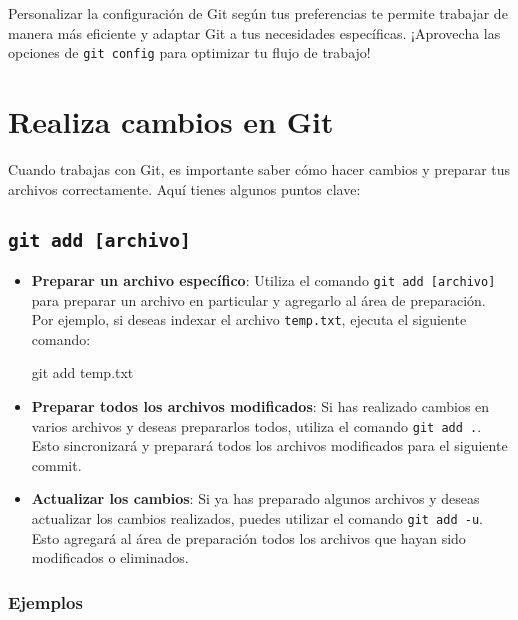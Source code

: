 \documentclass[
  a4paper,
]{article}
\newenvironment{Shaded}{}{}
\newcommand{\FunctionTok}[1]{\textcolor[rgb]{0.44,0.26,0.76}{#1}}
\newcommand{\NormalTok}[1]{\textcolor[rgb]{0.14,0.16,0.18}{#1}}
\begin{document}
Personalizar la configuración de Git según tus preferencias te permite
trabajar de manera más eficiente y adaptar Git a tus necesidades
específicas. ¡Aprovecha las opciones de \texttt{git\ config} para
optimizar tu flujo de trabajo!

\section{Realiza cambios en Git}\label{realiza-cambios-en-git}

Cuando trabajas con Git, es importante saber cómo hacer cambios y
preparar tus archivos correctamente. Aquí tienes algunos puntos clave:

\subsection{\texorpdfstring{\texttt{git\ add\ {[}archivo{]}}}{git add {[}archivo{]}}}\label{git-add-archivo}

\begin{itemize}
\item
  \textbf{Preparar un archivo específico}: Utiliza el comando
  \texttt{git\ add\ {[}archivo{]}} para preparar un archivo en
  particular y agregarlo al área de preparación. Por ejemplo, si deseas
  indexar el archivo \texttt{temp.txt}, ejecuta el siguiente comando:

\begin{Shaded}
\begin{Highlighting}[]
\FunctionTok{git}\NormalTok{ add temp.txt}
\end{Highlighting}
\end{Shaded}
\item
  \textbf{Preparar todos los archivos modificados}: Si has realizado
  cambios en varios archivos y deseas prepararlos todos, utiliza el
  comando \texttt{git\ add\ .}. Esto sincronizará y preparará todos los
  archivos modificados para el siguiente commit.
\item
  \textbf{Actualizar los cambios}: Si ya has preparado algunos archivos
  y deseas actualizar los cambios realizados, puedes utilizar el comando
  \texttt{git\ add\ -u}. Esto agregará al área de preparación todos los
  archivos que hayan sido modificados o eliminados.
\end{itemize}

\subsubsection{Ejemplos}\label{ejemplos-1}
\end{document}
